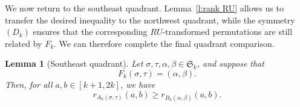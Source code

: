 \documentclass[12pt]{amsart}
\newtheorem{lem}[thm]{Lemma}
\theoremstyle{definition}
\numberwithin{equation}{section}
\begin{document}
We now return to the southeast quadrant. Lemma~\ref{l:rank RU} allows us to transfer the desired inequality to the northwest
quadrant, while the symmetry $(D_k)$ ensures that the corresponding
$RU$-transformed permutations are still related by $F_k$. We can
therefore complete the final quadrant comparison.

\begin{lem}[Southeast quadrant]\label{l:SE quadrant}
Let $\sigma,\tau,\alpha,\beta\in\mathfrak S_k$, and suppose that
\begin{equation*}
F_k(\sigma,\tau)=(\alpha,\beta).
\end{equation*}
Then, for all $a,b\in[k+1,2k]$, we have
\begin{equation*}
r_{A_k(\sigma,\tau)}(a,b)
\geq
r_{B_k(\alpha,\beta)}(a,b).
\end{equation*}
\end{lem}
\end{document}
